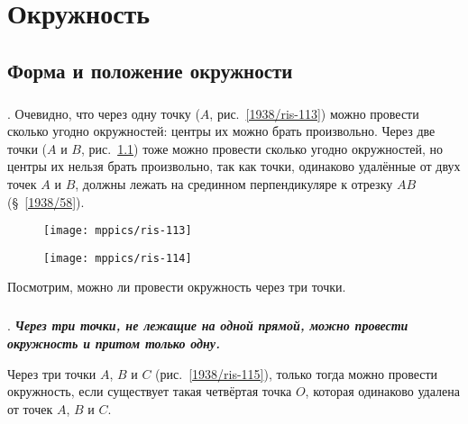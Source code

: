 \chapter{Окружность}

\section{Форма и положение окружности}

\paragraph{}\label{1938/103}
.
Очевидно, что через одну точку ($A$, рис.~\ref{1938/ris-113}) можно провести сколько угодно окружностей:
центры их можно брать произвольно.
Через две точки ($A$ и $B$, рис.~\ref{1938/ris-114}) тоже можно провести сколько угодно окружностей, но центры их нельзя брать произвольно, так как точки, одинаково удалённые от двух точек $A$ и $B$, должны лежать на срединном перпендикуляре к отрезку $AB$ (§~\ref{1938/58}). 

\begin{figure}[h!]
\begin{minipage}{.48\textwidth}
\centering
\texttt{[image: mppics/ris-113]}
\end{minipage}
\hfill
\begin{minipage}{.48\textwidth}
\centering
\texttt{[image: mppics/ris-114]}
\end{minipage}

\medskip

\begin{minipage}{.48\textwidth}
\centering
\caption{}\label{1938/ris-113}
\end{minipage}
\hfill
\begin{minipage}{.48\textwidth}
\centering
\caption{}\label{1938/ris-114}
\end{minipage}
\vskip-4mm
\end{figure}

Посмотрим, можно ли провести окружность через три точки.

\paragraph{}\label{1938/104}
.
\textbf{\emph{Через три точки, не лежащие на одной прямой, можно провести окружность и притом только одну.}}

Через три точки $A$, $B$ и $C$ (рис.~\ref{1938/ris-115}), только тогда можно провести окружность, если существует такая четвёртая точка $O$, которая одинаково удалена от точек $A$, $B$ и $C$.


